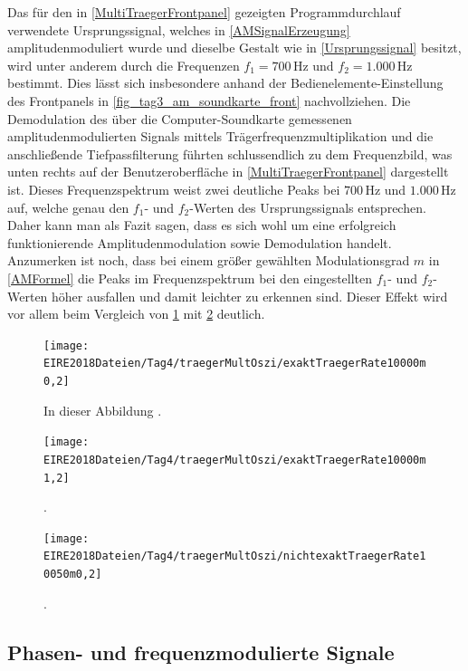 \documentclass[
a4paper,
12pt,
pagesize,
ngerman
]{scrartcl}
\begin{document}
	Das für den in \cref{MultiTraegerFrontpanel} gezeigten Programmdurchlauf verwendete Ursprungssignal, welches in \cref{AMSignalErzeugung} amplitudenmoduliert wurde und dieselbe Gestalt wie in \cref{Ursprungssignal} besitzt, wird unter anderem durch die Frequenzen $f_1 = 700\,$Hz und $f_2 = 1.000\,$Hz bestimmt. 
	Dies lässt sich insbesondere anhand der Bedienelemente-Einstellung des Frontpanels in \cref{fig_tag3_am_soundkarte_front} nachvollziehen. 
	Die Demodulation des über die Computer-Soundkarte gemessenen amplitudenmodulierten Signals mittels Trägerfrequenzmultiplikation und die anschließende Tiefpassfilterung führten schlussendlich zu dem Frequenzbild, was unten rechts auf der Benutzeroberfläche in \cref{MultiTraegerFrontpanel} dargestellt ist. 
	Dieses Frequenzspektrum weist zwei deutliche Peaks bei $700\,$Hz und $1.000\,$Hz auf, welche genau den $f_1$- und $f_2$-Werten des Ursprungssignals entsprechen. 
	Daher kann man als Fazit sagen, dass es sich wohl um eine erfolgreich funktionierende Amplitudenmodulation sowie Demodulation handelt. 
	Anzumerken ist noch, dass bei einem größer gewählten Modulationsgrad $m$ in \cref{AMFormel} die Peaks im Frequenzspektrum bei den eingestellten $f_1$- und $f_2$-Werten höher ausfallen und damit leichter zu erkennen sind. Dieser Effekt wird vor allem beim Vergleich von \cref{AMDemodsuccm02} mit \cref{AMDemodsuccm12} deutlich.
	
	\begin{figure}[H]
		\centering
		\texttt{[image: EIRE2018Dateien/Tag4/traegerMultOszi/exaktTraegerRate10000m0,2]}
		\caption{In dieser Abbildung .}
		\label{AMDemodsuccm02}
	\end{figure}

	\noindent 

	\begin{figure}[H]
		\centering
		\texttt{[image: EIRE2018Dateien/Tag4/traegerMultOszi/exaktTraegerRate10000m1,2]}
		\caption{.}
		\label{AMDemodsuccm12}
	\end{figure}

	\noindent 

	\begin{figure}[H]
		\centering
		\texttt{[image: EIRE2018Dateien/Tag4/traegerMultOszi/nichtexaktTraegerRate10050m0,2]}
		\caption{.}
		\label{AMDemodfailm02}
	\end{figure}
	
	\subsection{Phasen- und frequenzmodulierte Signale}
	
\end{document}
